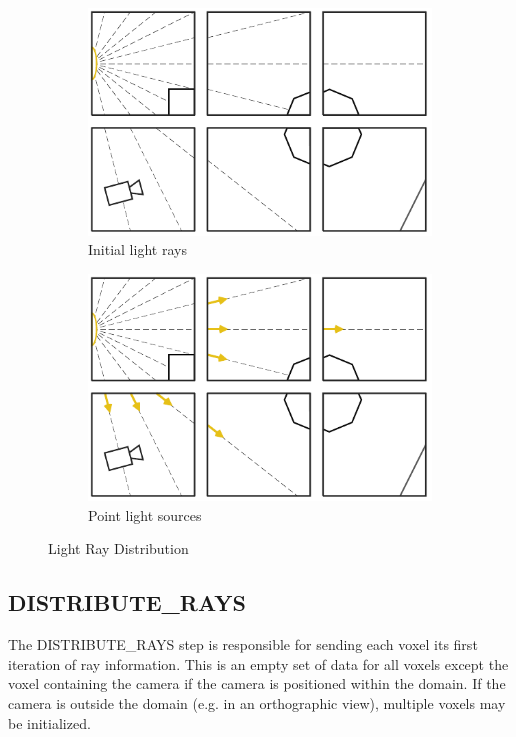 \begin{figure}[!htb]
\centering
\begin{subfigure}{0.49\textwidth}
 \centering
  \includegraphics[width=.98\columnwidth]{drawings/Lights1.pdf}
  \caption{Initial light rays}
\end{subfigure}
\begin{subfigure}{0.49\textwidth}
 \centering
  \includegraphics[width=.98\columnwidth]{drawings/Lights2.pdf}
  \caption{Point light sources}
\end{subfigure}
\caption{Light Ray Distribution}
\label{fig:light}
\end{figure}

\subsection{DISTRIBUTE\_RAYS}

The DISTRIBUTE\_RAYS step is responsible for sending each voxel its
first iteration of ray information. This is an empty set of data for
all voxels except the voxel containing the camera if the camera is
positioned within the domain. If the camera is outside the domain
(e.g. in an orthographic view), multiple voxels may be initialized.

